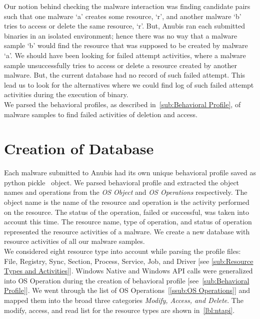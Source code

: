 Our notion behind checking the malware interaction was finding candidate pairs such that one malware `a' creates some resource, `r', and another malware `b' tries to access or delete the same resource, `r'.
But, Anubis ran each submitted binaries in an isolated environment; hence there was no way that a malware sample `b' would find the resource that was supposed to be created by malware `a'.
We should have been looking for failed attempt activities, where a malware sample unsuccessfully tries to access or delete a resource created by another malware.
But, the current database had no record of such failed attempt.
This lead us to look for the alternatives where we could find log of such failed attempt activities during the execution of binary.\\

We parsed the behavioral profiles, as described in~\autoref{sub:Behavioral Profile}, of malware samples to find failed activities of deletion and access.
\section{Creation of Database}
\label{sec:Creation of Database}
Each malware submitted to Anubis had its own unique behavioral profile saved as python pickle~\cite{pythonpickle} object.
We parsed behavioral profile and extracted the object names and operations from the \emph{OS Object} and \emph{OS Operations} respectively.
The object name is the name of the resource and operation is the activity performed on the resource.
The status of the operation, failed or successful, was taken into account this time.
The resource name, type of operation, and status of operation represented the resource activities of a malware.
We create a new database with resource activities of all our malware samples.\\

We considered eight resource type into account while parsing the profile files: File, Registry, Sync, Section, Process, Service, Job, and Driver [see \autoref{sub:Resource Types and Activities}].
Windows Native and Windows API calls were generalized into OS Operation during the creation of behavioral profile [see~\autoref{sub:Behavioral Profile}].
We went through the list of OS Operations~[\autoref{ssub:OS Operations}] and mapped them into the broad three categories \emph{Modify, Access, and Delete}.
The modify, access, and read list for the resource types \emph{\getresourcetypes{}} are shown in~\autoref{lbl:ntapi}.\\

